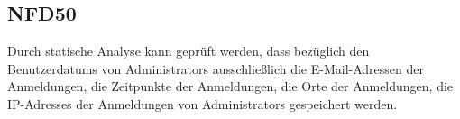 \subsection*{NFD50}
Durch \gls{statische Analyse} kann geprüft werden, dass bezüglich den \Glspl{Benutzerdatum} von \Glspl{Administrator} ausschließlich die E-Mail-Adressen der Anmeldungen, die Zeitpunkte der Anmeldungen, die Orte der Anmeldungen, die \Glspl{IP-Adresse} der Anmeldungen von \Glspl{Administrator} gespeichert werden.